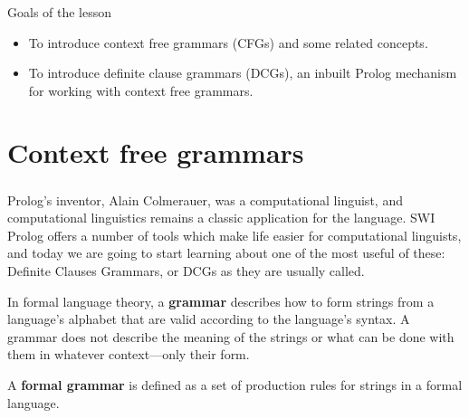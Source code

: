 \begin{frame}
	\frametitle{\insertsection}
	Goals of the lesson
	\begin{itemize}
		\item To introduce context free grammars (CFGs) and some related concepts.
		\item To introduce definite clause grammars (DCGs), an inbuilt Prolog mechanism	for working with context free grammars.
	\end{itemize}
\end{frame}


\section{Context free grammars}

\begin{frame}
	\frametitle{\insertsection}
	
	Prolog's inventor, Alain Colmerauer, was a computational linguist, and computational linguistics remains a classic application for
	the language. SWI Prolog offers a number of tools which make life easier for computational linguists, and today we are going to start
	learning about one of the most useful of these: Definite Clauses Grammars, or DCGs as they are usually called.
	
	In formal language theory, a \textbf{grammar} describes how to form strings from a language's alphabet that are valid according to the language's syntax. 
	A grammar does not describe the meaning of the strings or what can be done with them in whatever context—only their form. 
	
	A \textbf{formal grammar} is defined as a set of production rules for strings in a formal language.
	
\end{frame}


